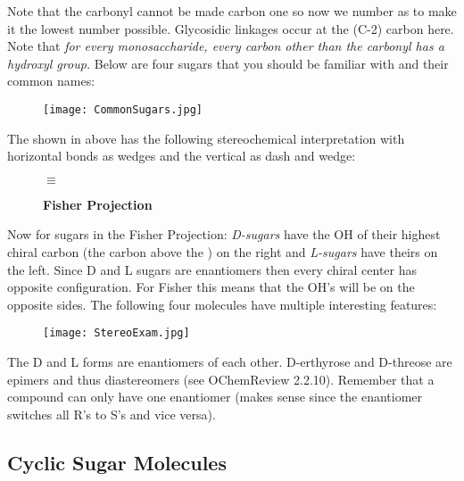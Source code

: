 \documentclass[../Bio_chemistryReview.tex]{subfiles}
\begin{document}
\begin{center}
  \centering
  \setatomsep{2em}
\end{center}
Note that the carbonyl cannot be made carbon one so now we number as to make it
the lowest number possible. Glycosidic linkages occur at the (C-2) carbon here.
Note that \emph{for every monosaccharide, every carbon other than the carbonyl
has a hydroxyl group.} Below are four sugars that you should be familiar with
and their common names: 
\begin{figure}[h]
  \centering
  \texttt{[image: CommonSugars.jpg]}
\end{figure}
The  shown in  above has the following
stereochemical interpretation with horizontal bonds as wedges and the vertical
as dash and wedge:
\begin{figure}[h]
  \centering
  \caption{\textbf{Fisher Projection}}
  \vspace{1em}
   \qquad $ \equiv $ \qquad
  \\ [0.5cm]
  \label{Fisher}
\end{figure}
Now for sugars in the Fisher Projection: \emph{D-sugars} have the OH of their
highest chiral carbon (the carbon above the ) on the right and
\emph{L-sugars} have theirs on the left. Since D and L sugars are enantiomers
then every chiral center has opposite configuration. For Fisher this means that
the OH's will be on the opposite sides. The following four molecules have
multiple interesting features:

\begin{figure}[h]
  \centering
  \texttt{[image: StereoExam.jpg]}
\end{figure}

The D and L forms are enantiomers of each other. D-erthyrose and D-threose are
epimers and thus diastereomers (see OChemReview 2.2.10). Remember that a
compound can only have one enantiomer (makes sense since the enantiomer switches
all R's to S's and vice versa).

\subsection{Cyclic Sugar Molecules\supdag}
\end{document}
